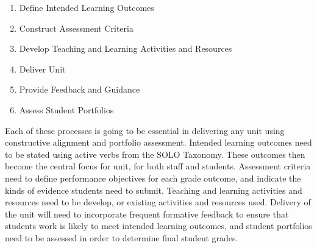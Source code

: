 \begin{enumerate}
	\item Define Intended Learning Outcomes
	\item Construct Assessment Criteria
	\item Develop Teaching and Learning Activities and Resources
	\item Deliver Unit
	\item Provide Feedback and Guidance
	\item Assess Student Portfolios
\end{enumerate}

Each of these processes is going to be essential in delivering any unit using constructive alignment and portfolio assessment. Intended learning outcomes need to be stated using active verbs from the SOLO Taxonomy. These outcomes then become the central focus for unit, for both staff and students. Assessment criteria need to define performance objectives for each grade outcome, and indicate the kinds of evidence students need to submit. Teaching and learning activities and resources need to be develop, or existing activities and resources used. Delivery of the unit will need to incorporate frequent formative feedback to ensure that students work is likely to meet intended learning outcomes, and student portfolios need to be assessed in order to determine final student grades. 




